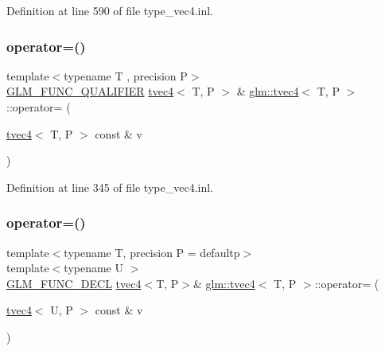 Definition at line 590 of file type\+\_\+vec4.\+inl.

\mbox{\label{structglm_1_1tvec4_a0997bf645d42c36ec509712b8d3b9e56}} 
\subsubsection{\texorpdfstring{operator=()}{operator=()}\hspace{0.1cm}{\footnotesize\ttfamily [1/3]}}
{\footnotesize\ttfamily template$<$typename T , precision P$>$ \\
\mbox{\hyperlink{setup_8hpp_a33fdea6f91c5f834105f7415e2a64407}{G\+L\+M\+\_\+\+F\+U\+N\+C\+\_\+\+Q\+U\+A\+L\+I\+F\+I\+ER}} \mbox{\hyperlink{structglm_1_1tvec4}{tvec4}}$<$ T, P $>$ \& \mbox{\hyperlink{structglm_1_1tvec4}{glm\+::tvec4}}$<$ T, P $>$\+::operator= (\begin{DoxyParamCaption}\item[{\mbox{\hyperlink{structglm_1_1tvec4}{tvec4}}$<$ T, P $>$ const \&}]{v }\end{DoxyParamCaption})}



Definition at line 345 of file type\+\_\+vec4.\+inl.

\mbox{\label{structglm_1_1tvec4_ac0decc5432f220ec3026a99866ee356d}} 
\subsubsection{\texorpdfstring{operator=()}{operator=()}\hspace{0.1cm}{\footnotesize\ttfamily [2/3]}}
{\footnotesize\ttfamily template$<$typename T, precision P = defaultp$>$ \\
template$<$typename U $>$ \\
\mbox{\hyperlink{setup_8hpp_ab2d052de21a70539923e9bcbf6e83a51}{G\+L\+M\+\_\+\+F\+U\+N\+C\+\_\+\+D\+E\+CL}} \mbox{\hyperlink{structglm_1_1tvec4}{tvec4}}$<$T, P$>$\& \mbox{\hyperlink{structglm_1_1tvec4}{glm\+::tvec4}}$<$ T, P $>$\+::operator= (\begin{DoxyParamCaption}\item[{\mbox{\hyperlink{structglm_1_1tvec4}{tvec4}}$<$ U, P $>$ const \&}]{v }\end{DoxyParamCaption})}

